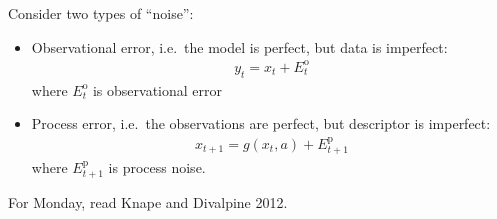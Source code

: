 \documentclass{article}
\begin{document}
    Consider two types of ``noise'':
    \begin{itemize}
        \item Observational error, i.e.~the model is perfect, but data is imperfect:
        \begin{align}
            y_t = x_t + {E_t^{\text{o}}}
        \end{align}
        where $E_t^\text{o}$ is observational error
        \item Process error, i.e.~the observations are perfect, but descriptor is imperfect:
        \begin{align}
            x_{t+1} = g(x_t,a) + E_{t+1}^\text{p}
        \end{align}
        where $E_{t+1}^\text{p}$ is process noise.
    \end{itemize}

    For Monday, read Knape and Divalpine 2012.
\end{document}
